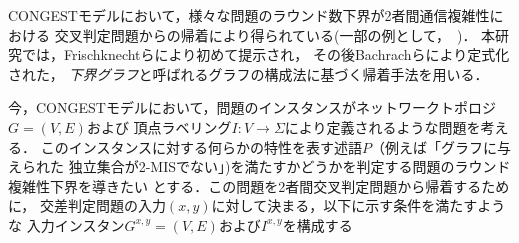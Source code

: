 \documentclass[12pt]{thesis}
\newcommand{\CONGEST}{\textsf{CONGEST}}
\theoremstyle{definition}
\begin{document}
{\CONGEST}モデルにおいて，様々な問題のラウンド数下界が2者間通信複雑性における
交叉判定問題からの帰着により得られている(一部の例として，~\cite{sarma2012distributed,fischer2018possibilities,czumaj2020detecting})．
本研究では，Frischknechtら\cite{frischknecht2012networks}により初めて提示され，
その後Bachrachら\cite{bacrach2019hardness}により定式化された，
\emph{下界グラフ}と呼ばれるグラフの構成法に基づく帰着手法を用いる．

今，{\CONGEST}モデルにおいて，問題のインスタンスがネットワークトポロジ$G = (V, E)$および
頂点ラベリング$I : V \to \Sigma$により定義されるような問題を考える．
このインスタンスに対する何らかの特性を表す述語$P$（例えば「グラフに与えられた
独立集合が2-MISでない」)を満たすかどうかを判定する問題のラウンド複雑性下界を導きたい
とする．この問題を2者間交叉判定問題から帰着するために，
交差判定問題の入力$(x, y)$に対して決まる，以下に示す条件を満たすような
入力インスタン$G^{x, y} = (V, E)$および$I^{x, y}$を構成する
\end{document}

